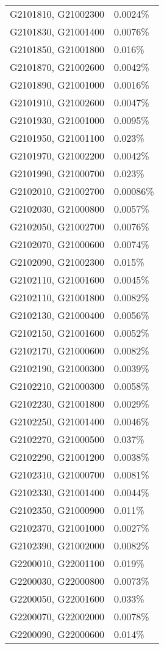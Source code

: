 \begin{longtable}[]{@{}ll@{}}
G2101810, G21002300 & 0.0024\% \\
G2101830, G21001400 & 0.0076\% \\
G2101850, G21001800 & 0.016\% \\
G2101870, G21002600 & 0.0042\% \\
G2101890, G21001000 & 0.0016\% \\
G2101910, G21002600 & 0.0047\% \\
G2101930, G21001000 & 0.0095\% \\
G2101950, G21001100 & 0.023\% \\
G2101970, G21002200 & 0.0042\% \\
G2101990, G21000700 & 0.023\% \\
G2102010, G21002700 & 0.00086\% \\
G2102030, G21000800 & 0.0057\% \\
G2102050, G21002700 & 0.0076\% \\
G2102070, G21000600 & 0.0074\% \\
G2102090, G21002300 & 0.015\% \\
G2102110, G21001600 & 0.0045\% \\
G2102110, G21001800 & 0.0082\% \\
G2102130, G21000400 & 0.0056\% \\
G2102150, G21001600 & 0.0052\% \\
G2102170, G21000600 & 0.0082\% \\
G2102190, G21000300 & 0.0039\% \\
G2102210, G21000300 & 0.0058\% \\
G2102230, G21001800 & 0.0029\% \\
G2102250, G21001400 & 0.0046\% \\
G2102270, G21000500 & 0.037\% \\
G2102290, G21001200 & 0.0038\% \\
G2102310, G21000700 & 0.0081\% \\
G2102330, G21001400 & 0.0044\% \\
G2102350, G21000900 & 0.011\% \\
G2102370, G21001000 & 0.0027\% \\
G2102390, G21002000 & 0.0082\% \\
G2200010, G22001100 & 0.019\% \\
G2200030, G22000800 & 0.0073\% \\
G2200050, G22001600 & 0.033\% \\
G2200070, G22002000 & 0.0078\% \\
G2200090, G22000600 & 0.014\% \\

\end{longtable}
